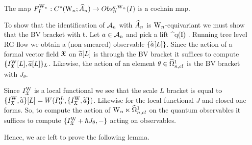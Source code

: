 \begin{prop}
The map $F_I^\Vect : C^\ast (\Vect ; \hA_n) \to Obs^{q, \Vect}_n (I)$ is a cochain map.
\end{prop}




To show that the identification of $\cA_n$ with $\hA_n$ is
$\Vect$-equivariant we must show that the BV bracket with t. Let $a \in \cA_n$ and pick
a lift 
\ben
{} \in \bObs^q(I) .
\een 
Running tree level RG-flow we obtain a (non-smeared) observable
$\{\Tilde{a}[L]\}$. Since the action of a formal vector field $\fX$ on
$\Tilde{a}[L]$ is through the BV bracket it suffices to compute
$\{I^{\rm W}_\fX [L] , \Tilde{a}[L]\}_L$. Likewise, the action of an element
$\theta \in \hOmega^1_{n,cl}$ is the BV bracket with $J_\theta$.

Since $I_\fX^{\rm W}$ is a local functional we see that the scale $L$
bracket is equal
to $\{I_\fX^{\rm W}, \Tilde{a}\}[L] = W(P_0^L, \{I_\fX^{\rm W},
\Tilde{a}\})$. Likewise for the local functional $J$ and closed
one-forms. So, to compute the action of $\Vect \ltimes \hOmega^1_{n,cl}$ on the
quantum observables it suffices to compute $\{I_\fX^{\rm W} + \hbar
J_\theta , -\}$ acting on observables.

Hence, we are left to prove the following lemma.

